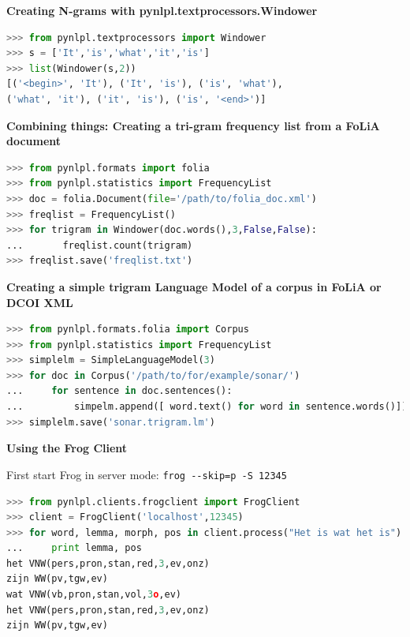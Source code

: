 \documentclass[compress]{beamer}
\begin{document}
\begin{frame}[fragile]

\textbf{Creating N-grams with pynlpl.textprocessors.Windower}

\begin{lstlisting}[language=python]
>>> from pynlpl.textprocessors import Windower
>>> s = ['It','is','what','it','is']
>>> list(Windower(s,2))
[('<begin>', 'It'), ('It', 'is'), ('is', 'what'), 
('what', 'it'), ('it', 'is'), ('is', '<end>')]
\end{lstlisting}


\end{frame}
        



\begin{frame}[fragile]

\textbf{Combining things: Creating a tri-gram frequency list from a FoLiA document} 

\begin{lstlisting}[language=python]
>>> from pynlpl.formats import folia
>>> from pynlpl.statistics import FrequencyList
>>> doc = folia.Document(file='/path/to/folia_doc.xml')
>>> freqlist = FrequencyList()
>>> for trigram in Windower(doc.words(),3,False,False):
...       freqlist.count(trigram)
>>> freqlist.save('freqlist.txt')
\end{lstlisting}

\end{frame}
    

\begin{frame}[fragile]

\textbf{Creating a simple trigram Language Model of a corpus in FoLiA or DCOI XML} 

\begin{lstlisting}[language=python]
>>> from pynlpl.formats.folia import Corpus
>>> from pynlpl.statistics import FrequencyList
>>> simplelm = SimpleLanguageModel(3)
>>> for doc in Corpus('/path/to/for/example/sonar/')
...     for sentence in doc.sentences():
...         simpelm.append([ word.text() for word in sentence.words()])
>>> simplelm.save('sonar.trigram.lm')   
\end{lstlisting}


\end{frame}


\begin{frame}[fragile]

\textbf{Using the Frog Client}

First start Frog in server mode: \verb|frog --skip=p -S 12345|

\begin{lstlisting}[language=python]
>>> from pynlpl.clients.frogclient import FrogClient
>>> client = FrogClient('localhost',12345)
>>> for word, lemma, morph, pos in client.process("Het is wat het is"):
...     print lemma, pos
het VNW(pers,pron,stan,red,3,ev,onz)
zijn WW(pv,tgw,ev)	
wat VNW(vb,pron,stan,vol,3o,ev)
het VNW(pers,pron,stan,red,3,ev,onz)
zijn WW(pv,tgw,ev)
\end{lstlisting}

\end{frame}
\end{document}
